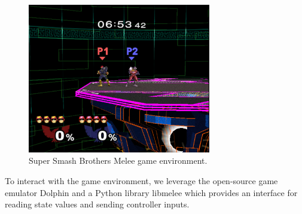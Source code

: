 \begin{figure}[!htb]
\centering
	\includegraphics[width=80mm]{stage.png}
	\caption{Super Smash Brothers Melee game environment. \label{melee}}
\end{figure}

To interact with the game environment, we leverage the open-source game emulator Dolphin and a Python library libmelee which provides an interface for reading state values and sending controller inputs. 







